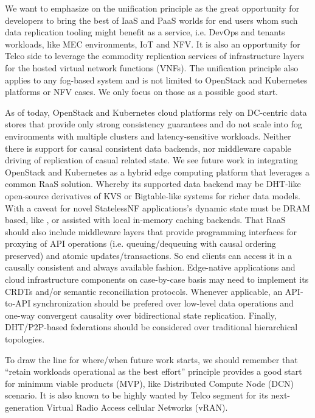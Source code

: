 \documentclass[conference]{IEEEtran}
\begin{document}
We want to emphasize on the unification principle as the great opportunity for
developers to bring the best of IaaS and PaaS worlds for end users whom such
data replication tooling might benefit as a service, i.e. DevOps and tenants
workloads, like MEC environments, IoT and NFV. It is also an opportunity for
Telco side to leverage the commodity replication services of infrastructure
layers for the hosted virtual network functions (VNFs). The unification
principle also applies to any fog-based system and is not limited to OpenStack
and Kubernetes platforms or NFV cases. We only focus on those as a possible
good start.

As of today, OpenStack and Kubernetes cloud platforms rely on DC-centric data
stores that provide only strong consistency guarantees and do not scale into
fog environments with multiple clusters and latency-sensitive workloads.
Neither there is support for causal consistent data backends, nor middleware
capable driving of replication of casual related state. We see future work in
integrating OpenStack and Kubernetes as a hybrid edge computing platform that
leverages a common RaaS solution. Whereby its supported data backend may be
DHT-like open-source derivatives of\cite{b17} KVS or Bigtable-like systems for
richer data models. With a caveat for novel StatelessNF applications's dynamic
state must be DRAM based, like \cite{b18}, or assisted with local in-memory
caching backends. That RaaS should also include middleware layers that provide
programming interfaces for proxying of API operations (i.e. queuing/dequeuing
with causal ordering preserved) and atomic updates/transactions\cite{b1}. So
end clients can access it in a causally consistent and always available
fashion. Edge-native applications and cloud infrastructure components on
case-by-case basis may need to implement its CRDTs and/or semantic
reconciliation protocols. Whenever applicable, an API-to-API synchronization
should be prefered over low-level data operations and one-way convergent
causality over bidirectional state replication. Finally, DHT/P2P-based
federations\cite{b27} should be considered over traditional hierarchical
topologies.

To draw the line for where/when future work starts, we should remember
that ``retain workloads operational as the best effort'' principle provides a
good start for minimum viable products (MVP), like Distributed Compute Node
(DCN) scenario. It is also known to be highly wanted by Telco segment for its
next-generation Virtual Radio Access cellular Networks (vRAN).
\end{document}
